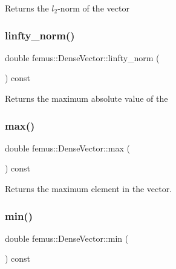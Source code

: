 \begin{DoxyReturn}{Returns}
the $l_2$-\/norm of the vector 
\end{DoxyReturn}
\mbox{\label{classfemus_1_1_dense_vector_a036328ba679553324981f7014bbc2500}} 
\subsubsection{\texorpdfstring{linfty\+\_\+norm()}{linfty\_norm()}}
{\footnotesize\ttfamily double femus\+::\+Dense\+Vector\+::linfty\+\_\+norm (\begin{DoxyParamCaption}{ }\end{DoxyParamCaption}) const\hspace{0.3cm}{\ttfamily [inline]}}

\begin{DoxyReturn}{Returns}
the maximum absolute value of the 
\end{DoxyReturn}
\mbox{\label{classfemus_1_1_dense_vector_a622888ea147eebeeb784feec0774ad22}} 
\subsubsection{\texorpdfstring{max()}{max()}}
{\footnotesize\ttfamily double femus\+::\+Dense\+Vector\+::max (\begin{DoxyParamCaption}{ }\end{DoxyParamCaption}) const\hspace{0.3cm}{\ttfamily [inline]}}

\begin{DoxyReturn}{Returns}
the maximum element in the vector. 
\end{DoxyReturn}
\mbox{\label{classfemus_1_1_dense_vector_afddbf21de9804dc92c2c0e2d217731fa}} 
\subsubsection{\texorpdfstring{min()}{min()}}
{\footnotesize\ttfamily double femus\+::\+Dense\+Vector\+::min (\begin{DoxyParamCaption}{ }\end{DoxyParamCaption}) const\hspace{0.3cm}{\ttfamily [inline]}}


